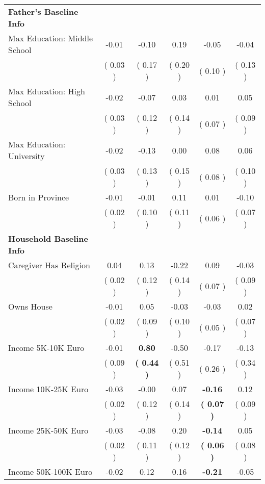 \begin{table}[H]
{\begin{tabular}{lccccc}
\midrule
\textbf{Father's Baseline Info} \\
\quad Max Education: Middle School &     -0.01 &     -0.10 &      0.19 &     -0.05 &     -0.04 \\
\quad  & (     0.03 ) & (     0.17 )  & (     0.20 )  & (     0.10 ) & (     0.13 ) \\
\quad Max Education: High School &     -0.02 &     -0.07 &      0.03 &      0.01 &      0.05 \\
\quad  & (     0.03 ) & (     0.12 )  & (     0.14 )  & (     0.07 ) & (     0.09 ) \\
\quad Max Education: University &     -0.02 &     -0.13 &      0.00 &      0.08 &      0.06 \\
\quad  & (     0.03 ) & (     0.13 )  & (     0.15 )  & (     0.08 ) & (     0.10 ) \\
\quad Born in Province &     -0.01 &     -0.01 &      0.11 &      0.01 &     -0.10 \\
\quad  & (     0.02 ) & (     0.10 )  & (     0.11 )  & (     0.06 ) & (     0.07 ) \\
\midrule
\textbf{Household Baseline Info} \\
\quad Caregiver Has Religion &      0.04 &      0.13 &     -0.22 &      0.09 &     -0.03 \\
\quad  & (     0.02 ) & (     0.12 )  & (     0.14 )  & (     0.07 ) & (     0.09 ) \\
\quad Owns House &     -0.01 &      0.05 &     -0.03 &     -0.03 &      0.02 \\
\quad  & (     0.02 ) & (     0.09 )  & (     0.10 )  & (     0.05 ) & (     0.07 ) \\
\quad Income 5K-10K Euro &     -0.01 & \textbf{     0.80} &     -0.50 &     -0.17 &     -0.13 \\
\quad  & (     0.09 ) & \textbf{(     0.44 )}  & (     0.51 )  & (     0.26 ) & (     0.34 ) \\
\quad Income 10K-25K Euro &     -0.03 &     -0.00 &      0.07 & \textbf{    -0.16} &      0.12 \\
\quad  & (     0.02 ) & (     0.12 )  & (     0.14 )  & \textbf{(     0.07 )} & (     0.09 ) \\
\quad Income 25K-50K Euro &     -0.03 &     -0.08 &      0.20 & \textbf{    -0.14} &      0.05 \\
\quad  & (     0.02 ) & (     0.11 )  & (     0.12 )  & \textbf{(     0.06 )} & (     0.08 ) \\
\quad Income 50K-100K Euro &     -0.02 &      0.12 &      0.16 & \textbf{    -0.21} &     -0.05 \\

\end{tabular}}
\end{table}
